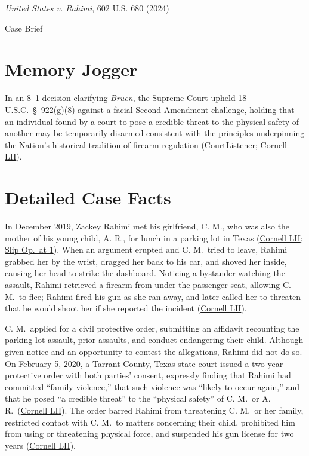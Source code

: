 \documentclass[12pt]{article}
\begin{document}
\begin{center}
{\LARGE \textit{United States v. Rahimi}, 602 U.S. 680 (2024)\par}
\vspace{0.8em}
{\large Case Brief\par}
\end{center}
\vspace{1em}

\section{Memory Jogger}

In an 8--1 decision clarifying \textit{Bruen}, the Supreme Court upheld 18 U.S.C.\ \S\ 922(g)(8) against a facial Second Amendment challenge, holding that an individual found by a court to pose a credible threat to the physical safety of another may be temporarily disarmed consistent with the principles underpinning the Nation's historical tradition of firearm regulation (\href{https://www.courtlistener.com/opinion/10600058/united-states-v-rahimi/}{CourtListener}; \href{https://www.law.cornell.edu/supremecourt/text/22-915}{Cornell LII}).

\section{Detailed Case Facts}

In December 2019, Zackey Rahimi met his girlfriend, C. M., who was also the mother of his young child, A. R., for lunch in a parking lot in Texas (\href{https://www.law.cornell.edu/supremecourt/text/22-915}{Cornell LII}; \href{https://www.supremecourt.gov/opinions/23pdf/22-915_8o6b.pdf}{Slip Op.\ at 1}). When an argument erupted and C. M.\ tried to leave, Rahimi grabbed her by the wrist, dragged her back to his car, and shoved her inside, causing her head to strike the dashboard. Noticing a bystander watching the assault, Rahimi retrieved a firearm from under the passenger seat, allowing C. M.\ to flee; Rahimi fired his gun as she ran away, and later called her to threaten that he would shoot her if she reported the incident (\href{https://www.law.cornell.edu/supremecourt/text/22-915}{Cornell LII}).

C. M.\ applied for a civil protective order, submitting an affidavit recounting the parking-lot assault, prior assaults, and conduct endangering their child. Although given notice and an opportunity to contest the allegations, Rahimi did not do so. On February 5, 2020, a Tarrant County, Texas state court issued a two-year protective order with both parties' consent, expressly finding that Rahimi had committed ``family violence,'' that such violence was ``likely to occur again,'' and that he posed ``a credible threat'' to the ``physical safety'' of C. M.\ or A. R.\ (\href{https://www.law.cornell.edu/supremecourt/text/22-915}{Cornell LII}). The order barred Rahimi from threatening C. M.\ or her family, restricted contact with C. M.\ to matters concerning their child, prohibited him from using or threatening physical force, and suspended his gun license for two years (\href{https://www.law.cornell.edu/supremecourt/text/22-915}{Cornell LII}).
\end{document}
